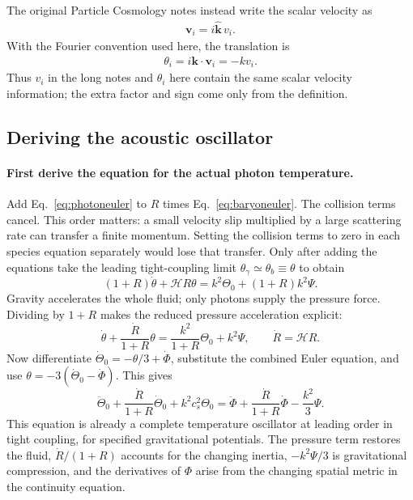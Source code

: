 \documentclass[12pt]{article}
\newcommand{\be}{\begin{eqnarray}}
\newcommand{\ee}{\end{eqnarray}}
\newcommand{\Hs}{\mathcal H}
\newcommand{\bk}{\mathbf k}
\newcommand{\bv}{\mathbf v}
\begin{document}
The original Particle Cosmology notes instead write the scalar velocity as
\be
\bv_i=i\hat{\bk}\,v_i.
\ee
With the Fourier convention used here, the translation is
\be
\boxed{\theta_i=i\bk\cdot\bv_i=-k v_i.}
\ee
Thus $v_i$ in the long notes and $\theta_i$ here contain the same scalar velocity
information; the extra factor and sign come only from the definition.

\subsection{Deriving the acoustic oscillator}
\paragraph{First derive the equation for the actual photon temperature.}
Add Eq.~\eqref{eq:photoneuler} to $R$ times Eq.~\eqref{eq:baryoneuler}.
The collision terms cancel. This order matters: a small velocity slip multiplied
by a large scattering rate can transfer a finite momentum. Setting the collision
terms to zero in each species equation separately would lose that transfer.
Only after adding the equations take the leading tight-coupling limit
$\theta_\gamma\simeq\theta_b\equiv\theta$ to obtain
\[
(1+R)\dot\theta+\Hs R\theta
=k^2\Theta_0+(1+R)k^2\Psi.
\]
Gravity accelerates the whole fluid; only photons supply the pressure force.
Dividing by $1+R$ makes the reduced pressure acceleration explicit:
\[
\dot\theta+\frac{\dot R}{1+R}\theta
=\frac{k^2}{1+R}\Theta_0+k^2\Psi,
\qquad \dot R=\Hs R.
\]
Now differentiate $\dot\Theta_0=-\theta/3+\dot\Phi$, substitute the combined Euler
equation, and use $\theta=-3(\dot\Theta_0-\dot\Phi)$. This gives
\[
\boxed{\ddot\Theta_0+\frac{\dot R}{1+R}\dot\Theta_0+k^2c_s^2\Theta_0
=\ddot\Phi+\frac{\dot R}{1+R}\dot\Phi-\frac{k^2}{3}\Psi.}
\]
This equation is already a complete temperature oscillator at leading order in
tight coupling, for specified gravitational potentials. The pressure term restores
the fluid, $\dot R/(1+R)$ accounts for the changing inertia, $-k^2\Psi/3$ is
gravitational compression, and the derivatives of $\Phi$ arise from the changing
spatial metric in the continuity equation.
\end{document}
